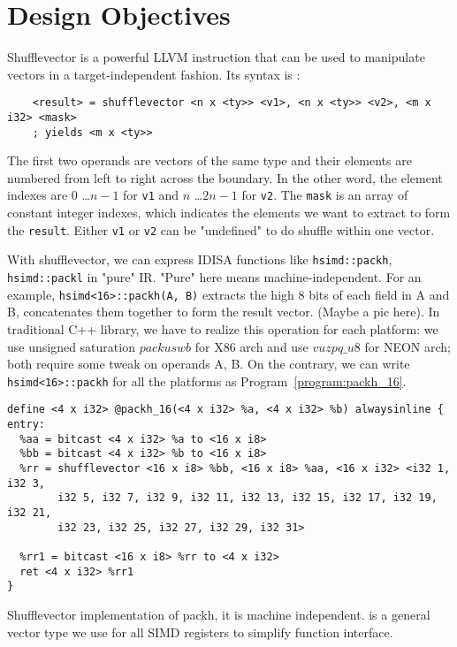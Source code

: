 %
%

\chapter{Design Objectives}
\label{three}


Shufflevector is a powerful LLVM instruction that can be used to manipulate vectors in a target-independent fashion. Its syntax is \cite{llvm_lang_ref}:

\begin{verbatim}
    <result> = shufflevector <n x <ty>> <v1>, <n x <ty>> <v2>, <m x i32> <mask>
    ; yields <m x <ty>>
\end{verbatim}

The first two operands are vectors of the same type and their elements are numbered from left to right across the boundary. In the other word, the element indexes are $0$ \ldots $n-1$ for {\tt v1} and $n$ \ldots $2n-1$ for {\tt v2}. The {\tt mask} is an array of constant integer indexes, which indicates the elements we want to extract to form the {\tt result}. Either {\tt v1} or {\tt v2} can be "undefined" to do shuffle within one vector.

With shufflevector, we can express IDISA functions like \verb|hsimd::packh|, \verb|hsimd::packl| in "pure" IR. "Pure" here means machine-independent. For an example, \verb|hsimd<16>::packh(A, B)| extracts the high 8 bits of each field in A and B, concatenates them together to form the result vector. (Maybe a pic here). In traditional C++ library, we have to realize this operation for each platform: we use unsigned saturation $packuswb$ for X86 arch and use $vuzpq\_u8$ for NEON arch; both require some tweak on operands A, B. On the contrary, we can write \verb|hsimd<16>::packh| for all the platforms as Program~\ref{program:packh_16}.

\begin{program}
\begin{verbatim}
define <4 x i32> @packh_16(<4 x i32> %a, <4 x i32> %b) alwaysinline {
entry:
  %aa = bitcast <4 x i32> %a to <16 x i8>
  %bb = bitcast <4 x i32> %b to <16 x i8>
  %rr = shufflevector <16 x i8> %bb, <16 x i8> %aa, <16 x i32> <i32 1, i32 3,
        i32 5, i32 7, i32 9, i32 11, i32 13, i32 15, i32 17, i32 19, i32 21,
        i32 23, i32 25, i32 27, i32 29, i32 31>

  %rr1 = bitcast <16 x i8> %rr to <4 x i32>
  ret <4 x i32> %rr1
}
\end{verbatim}
\caption[Shufflevector implementation of packh.]{Shufflevector implementation of packh, it is machine independent. {\tt <4 x i32>} is a general vector type we use for all SIMD registers to simplify function interface.}
\label{program:packh_16}
\end{program}

